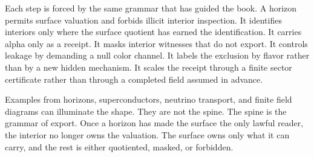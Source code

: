 Each step is forced by the same grammar that has guided the book. A horizon
permits surface valuation and forbids illicit interior inspection. It
identifies interiors only where the surface quotient has earned the
identification. It carries alpha only as a receipt. It masks interior
witnesses that do not export. It controls leakage by demanding a null color
channel. It labels the exclusion by flavor rather than by a new hidden
mechanism. It scales the receipt through a finite sector certificate rather
than through a completed field assumed in advance.

Examples from horizons, superconductors, neutrino transport, and finite
field diagrams can illuminate the shape. They are not the spine. The spine
is the grammar of export. Once a horizon has made the surface the only
lawful reader, the interior no longer owns the valuation. The surface owns
only what it can carry, and the rest is either quotiented, masked, or
forbidden.
